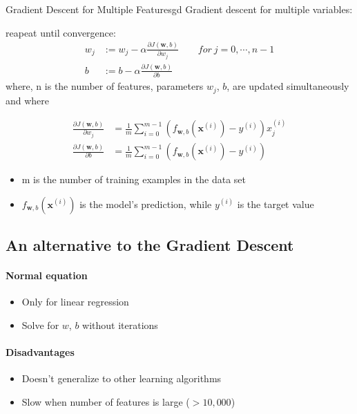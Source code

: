 \vspace{1em}
\begin{thmbox}{Gradient Descent for Multiple Features}{gd}
Gradient descent for multiple variables:

reapeat until convergence:
\begin{align}
    w_j &:= w_j - \alpha \frac{\partial J(\mathbf{w},b)}{\partial w_j} \ \ \ \ \ \ \ \ \ for\ j = 0, \cdots , n-1 \\
    b &:= b - \alpha \frac{\partial J(\mathbf{w},b)}{\partial b}
\end{align}
where, n is the number of features, parameters $w_j$,  $b$, are updated simultaneously and where  


\begin{align}
\frac{\partial J(\mathbf{w},b)}{\partial w_j}  &= \frac{1}{m} \sum\limits_{i = 0}^{m-1} (f_{\mathbf{w},b}(\mathbf{x}^{(i)}) - y^{(i)})x_{j}^{(i)} \tag{6}  \\
\frac{\partial J(\mathbf{w},b)}{\partial b}  &= \frac{1}{m} \sum\limits_{i = 0}^{m-1} (f_{\mathbf{w},b}(\mathbf{x}^{(i)}) - y^{(i)}) \tag{7}
\end{align}

\begin{notebox}
    \begin{itemize}
        \item m is the number of training examples in the data set
        \item $f_{\mathbf{w},b}(\mathbf{x}^{(i)})$ is the model's prediction, while $y^{(i)}$ is the target value
    \end{itemize}
\end{notebox}
\end{thmbox}

\subsection*{An alternative to the Gradient Descent}
\paragraph*{Normal equation}
\begin{itemize}
    \item Only for linear regression
    \item Solve for $w$, $b$ without iterations
\end{itemize}

\paragraph*{Disadvantages}
\begin{itemize}
    \item Doesn't generalize to other learning algorithms
    \item Slow when number of features is large ($>10,000$)
\end{itemize}

